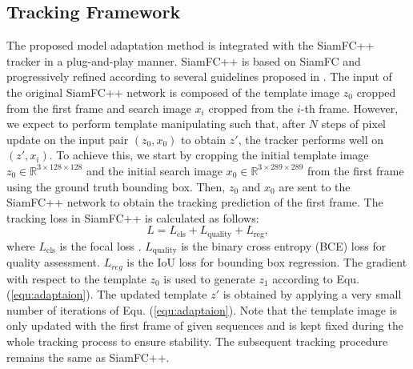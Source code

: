 \subsection{Tracking Framework}
The proposed model adaptation method is integrated with the SiamFC++ tracker \cite{SiamFC++} in a plug-and-play manner. SiamFC++ is based on SiamFC \cite{bertinetto2016fully} and progressively refined according to several guidelines proposed in \cite{SiamFC++}. The input of the original SiamFC++ network is composed of the template image $z_0$ cropped from the first frame and search image $x_i$ cropped from the $i$-th frame. However, we expect to perform template manipulating such that, after $N$ steps of pixel update on the input pair $(z_0, x_0)$ to obtain $z'$, the tracker performs well on $(z', x_i)$. To achieve this, we start by cropping the initial template image $z_0\in\mathbb R^{3\times128\times 128}$ and the initial search image $x_0\in\mathbb R^{3\times289\times 289}$ from the first frame using the ground truth bounding box.
Then, $z_0$ and $x_0$ are sent to the SiamFC++ network to obtain the tracking prediction of the first frame. The tracking loss in SiamFC++ \cite{SiamFC++} is calculated as follows:
\begin{equation}
    L = L_{\text{cls}} + L_{\text{quality}} + L_{\text{reg}},
\end{equation}
where $L_{\text{cls}}$ is the focal loss \cite{lin2017focal}. $L_{\text{quality}}$ is the binary cross entropy (BCE) loss for quality assessment. $L_{reg}$ is the IoU loss \cite{yu2016unitbox} for bounding box regression. The gradient with respect to the template $z_0$ is used to generate $z_1$ according to Equ. (\ref{equ:adaptaion}). The updated template $z'$ is obtained by applying a very small number of iterations of Equ. (\ref{equ:adaptaion}). Note that the template image is only updated with the first frame of given sequences and is kept fixed during the whole tracking process to ensure stability.
The subsequent tracking procedure remains the same as SiamFC++.

